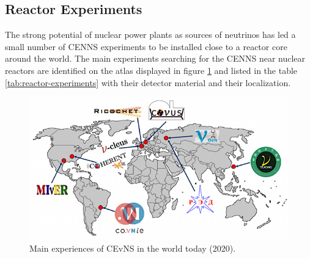 \subsection{Reactor Experiments}

The strong potential of nuclear power plants as sources of neutrinos has led a small number of CENNS experiments to be installed close to a reactor core around the world. The main experiments searching for the CENNS near nuclear reactors are identified on the atlas displayed in figure \ref{fig:cenns-exp-atlas} and listed in the table \ref{tab:reactor-experiments} with their detector material and their localization.

\begin{figure}
\centering
\includegraphics[scale=1]{Figures/Introduction/cenns_exp_atlas.pdf}
\caption{Main experiences of CEvNS in the world today (2020).
}
\label{fig:cenns-exp-atlas}
\end{figure}

